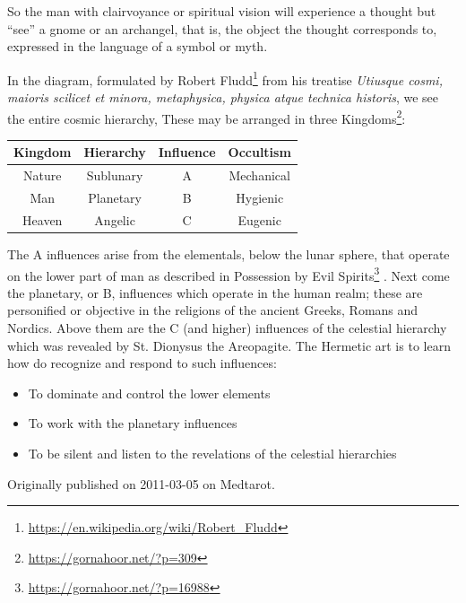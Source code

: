 So the man with clairvoyance or spiritual vision will experience a thought but ``see'' a gnome or an archangel, that is, the object the thought corresponds to, expressed in the language of a symbol or myth.

In the diagram, formulated by Robert Fludd\footnote{\url{https://en.wikipedia.org/wiki/Robert\_Fludd}} from his treatise \emph{Utiusque cosmi, maioris scilicet et minora, metaphysica, physica atque technica historis}, we see the entire cosmic hierarchy, These may be arranged in three Kingdoms\footnote{\url{https://gornahoor.net/?p=309}}:

\begin{table}[h]\small\centering
\begin{tabular}{*{4}{c}}\toprule
Kingdom & Hierarchy & Influence & Occultism \\\midrule
Nature & Sublunary & A & Mechanical \\
Man & Planetary & B & Hygienic \\
Heaven & Angelic & C & Eugenic \\\bottomrule
\end{tabular}
\end{table}

The A influences arise from the elementals, below the lunar sphere, that operate on the lower part of man as described in Possession by Evil Spirits\footnote{\url{https://gornahoor.net/?p=16988}} . Next come the planetary, or B, influences which operate in the human realm; these are personified or objective in the religions of the ancient Greeks, Romans and Nordics. Above them are the C (and higher) influences of the celestial hierarchy which was revealed by St. Dionysus the Areopagite. The Hermetic art is to learn how do recognize and respond to such influences:

\begin{itemize}


\item To dominate and control the lower elements

\item To work with the planetary influences

\item To be silent and listen to the revelations of the celestial hierarchies
\end{itemize}

Originally published on 2011-03-05 on Medtarot.



